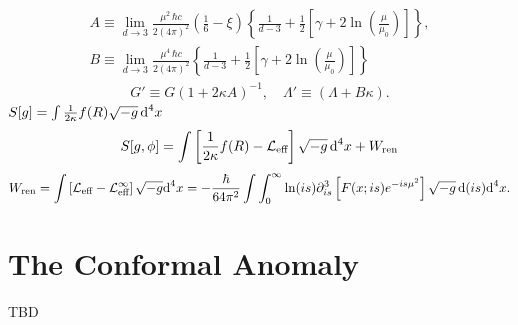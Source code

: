 \begin{subequations}
	\begin{gather}
		A\equiv \lim\limits_{d\to 3}\frac{\mu^2\,\hbar c}{2(4\pi)^2}\left(\frac{1}{6}-\xi\right)\left\{\frac{1}{d-3}+\frac{1}{2}\left[\gamma+2\ln\left(\frac{\mu}{\mu_0}\right)\right]\right\},\\
		B\equiv \lim\limits_{d\to 3}\frac{\mu^4\,\hbar c}{2(4\pi)^2}\left\{\frac{1}{d-3}+\frac{1}{2}\left[\gamma+2\ln\left(\frac{\mu}{\mu_0}\right)\right]\right\}
	\end{gather}
\end{subequations}
\begin{subequations}
	\begin{gather}
		G'\equiv G\left(1+2\kappa A\right)^{-1},\quad \Lambda'\equiv \left(\Lambda+B\kappa\right).
	\end{gather}
\end{subequations}
$S[g]=\int\frac{1}{2\kappa}f(R)\sqrt{-g}\,\text{d}^4x$
\begin{equation}
	S[g,\phi]=\int\left[\frac{1}{2\kappa}f(R)-\mathcal{L}_{\text{eff}}\right]\sqrt{-g}\,\text{d}^4x+ W_{\text{ren}}
\end{equation}
\begin{equation}
	W_{\text{ren}}=\int\left[\mathcal{L}_{\text{eff}}-\mathcal{L}_{\text{eff}}^{\infty}\right]\sqrt{-g}\text{d}^4 x=-\frac{\hbar}{64\pi^2}\int\int_{0}^\infty\ln(is)\partial_{is}^3\left[F(x;is)e^{-is\mu^2}\right]\sqrt{-g}\,\text{d}(is)\text{d}^4x.
\end{equation}
\section{The Conformal Anomaly}
TBD